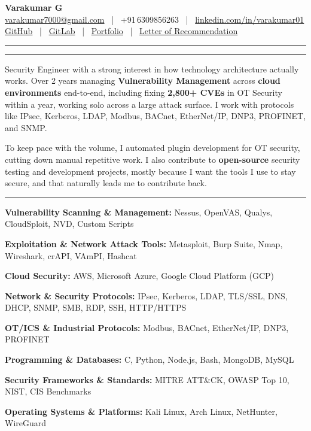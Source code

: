\documentclass[9pt,a4paper]{extarticle}
\newcommand{\resumeSection}[1]{%
  \vspace{5pt}%
  \noindent{\large\bfseries\MakeUppercase{#1}}\par%
  \vspace{-7pt}%
  \noindent\rule{\textwidth}{0.5pt}%
  \par\vspace{0pt}%
}
\newcommand{\techrow}[2]{\noindent\textbf{#1} #2\par}
\begin{document}

\vspace*{-8pt}
\begin{center}
  {\LARGE\bfseries Varakumar G}\\[2pt]
  \href{mailto:varakumar7000@gmail.com}{varakumar7000@gmail.com}
  ~|~ +91\,6309856263
  ~|~ \href{https://www.linkedin.com/in/varakumar01}{linkedin.com/in/varakumar01}\\[1pt]
  \href{https://github.com/varakumar01}{GitHub}
  ~|~ \href{https://gitlab.com/Tony_01}{GitLab}
  ~|~ \href{https://portfolio.dragnux.com}{Portfolio}
  ~|~ \href{https://drive.google.com/file/d/17c5RtAgWn5TdRQUxnDIvLQogPoUoxgO_/view?pli=1}{Letter of Recommendation}
\end{center}
\vspace{-1pt}\noindent\rule{\textwidth}{0.7pt}

\resumeSection{Professional Summary}

Security Engineer with a strong interest in how technology architecture actually works. Over 2 years managing \textbf{Vulnerability Management} across \textbf{cloud environments} end-to-end, including fixing \textbf{2,800+ CVEs} in OT Security within a year, working solo across a large attack surface. I work with protocols like IPsec, Kerberos, LDAP, Modbus, BACnet, EtherNet/IP, DNP3, PROFINET, and SNMP.

To keep pace with the volume, I automated plugin development for OT security, cutting down manual repetitive work. I also contribute to \textbf{open-source} security testing and development projects, mostly because I want the tools I use to stay secure, and that naturally leads me to contribute back.

\resumeSection{Technical Skills}

\techrow{Vulnerability Scanning \& Management:}{Nessus, OpenVAS, Qualys, CloudSploit, NVD, Custom Scripts}
\techrow{Exploitation \& Network Attack Tools:}{Metasploit, Burp Suite, Nmap, Wireshark, crAPI, VAmPI, Hashcat}
\techrow{Cloud Security:}{AWS, Microsoft Azure, Google Cloud Platform (GCP)}
\techrow{Network \& Security Protocols:}{IPsec, Kerberos, LDAP, TLS/SSL, DNS, DHCP, SNMP, SMB, RDP, SSH, HTTP/HTTPS}
\techrow{OT/ICS \& Industrial Protocols:}{Modbus, BACnet, EtherNet/IP, DNP3, PROFINET}
\techrow{Programming \& Databases:}{C, Python, Node.js, Bash, MongoDB, MySQL}
\techrow{Security Frameworks \& Standards:}{MITRE ATT\&CK, OWASP Top 10, NIST, CIS Benchmarks}
\techrow{Operating Systems \& Platforms:}{Kali Linux, Arch Linux, NetHunter, WireGuard}
\end{document}
